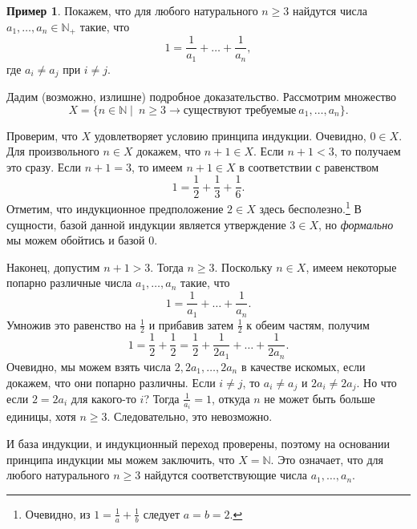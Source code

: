 \documentclass[12pt,notitlepage]{article}
\theoremstyle{plain}
\theoremstyle{definition}
\newtheorem{exm}[thm]{Пример}
\theoremstyle{plain}
\newcommand{\N}{\mathbb{N}}
\newcommand{\1}{\mathbf{1}}
\newcommand{\0}{\mathbf{0}}
\newcommand{\mcomm}[1]{}
\begin{document}
\begin{exm}
	Покажем, что для любого натурального $n \geq 3$ найдутся числа $a_1,\ldots,a_n \in \N_+$ такие, что
	$$1 = \frac{1}{a_1} + \ldots + \frac{1}{a_n},$$
	где $a_i \neq a_j$ при $i \neq j$.
	
	Дадим (возможно, излишне) подробное доказательство. Рассмотрим множество
	$$X = \{ n \in \N \mid\  n \geq 3 \to \mbox{существуют требуемые}\ a_1,\ldots, a_n\}.$$
	\mcomm{The Instructor might prefer a `predicate version' of this inductive proof instead.
		\medskip\\
		Many students justly see that the base case here is that of $n = 3$ essentially. Then they try to change \emph{the inductive principle} accordingly rather than the set or predicate in question. In my view, this practice is caused by their aversion to anything else than a simple equation in the inductive statement (like, say, an implication). This is counterproductive and the students should be discouraged from doing so at least in these easy early stage examples. They should be rather taught to adapt to the \emph{principle as it is} and to flexibly change the statement they want. Of course, these requirements may be finally lifted for harder problems and for students able to solve them.}
	Проверим, что $X$ удовлетворяет условию принципа индукции. Очевидно, $0 \in X$. Для произвольного $n \in X$ докажем, что $n + 1 \in X$. Если $n + 1 < 3$, то получаем это сразу. Если $n + 1 = 3$, то имеем $n+1 \in X$ в соответствии с равенством
	$$1 = \frac{1}{2} + \frac{1}{3} + \frac{1}{6}.$$
	Отметим, что индукционное предположение $2 \in X$ здесь бесполезно.\footnote{Очевидно, из $1 = \frac{1}{a} + \frac{1}{b}$ следует $a = b = 2$.} В сущности, базой данной индукции является утверждение $3 \in X$, но \emph{формально} мы можем обойтись и базой $0$.
	
	Наконец, допустим $n + 1 > 3$. Тогда $n \geq 3$. Поскольку $n \in X$, имеем некоторые попарно различные числа $a_1,\ldots, a_n$ такие, что 
	$$1 = \frac{1}{a_1} + \ldots + \frac{1}{a_n}.$$
	Умножив это равенство на $\frac{1}{2}$ и прибавив затем $\frac{1}{2}$ к обеим частям, получим
	$$1 = \frac{1}{2} + \frac{1}{2} = \frac{1}{2} + \frac{1}{2a_1} + \ldots + \frac{1}{2a_n}.$$
	Очевидно, мы можем взять числа $2, 2a_1, \ldots, 2a_n$ в качестве искомых, если докажем, что они попарно различны. Если $i \neq j$, то $a_i \neq a_j$ и $2a_i \neq 2a_j$. Но что если $2 = 2 a_i$ для какого-то $i$? Тогда $\frac{1}{a_i} = 1$, откуда $n$ не может быть больше единицы, хотя $n \geq 3$. Следовательно, это невозможно.
	
	И база индукции, и индукционный переход проверены, поэтому на основании принципа индукции мы можем заключить, что $X = \N$. Это означает, что для любого натурального $n \geq 3$ найдутся соответствующие числа $a_1,\ldots, a_n$.
\end{exm}
\end{document}
